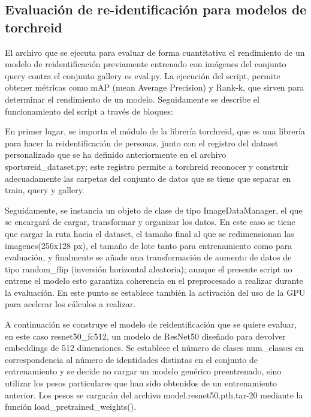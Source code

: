 \documentclass[12pt, a4paper, twoside]{article}
\begin{document}
 	\subsection{Evaluación de re-identificación para modelos de torchreid}
 	
 	El archivo que se ejecuta para evaluar de forma cuantitativa el rendimiento de un modelo de reidentificación previamente entrenado con imágenes del conjunto query contra el conjunto gallery es eval.py. La ejecución del script, permite obtener métricas como mAP (mean Average Precision) y Rank-k, que sirven para determinar el rendimiento de un modelo. Seguidamente se describe el funcionamiento del script a través de bloques:
 	
 	En primer lugar, se importa el módulo de la librería torchreid, que es una librería para hacer la reidentificación de personas, junto con el registro del dataset personalizado que se ha definido anteriormente en el archivo sportsreid\_dataset.py; este registro permite a torchreid reconocer y construir adecuadamente las carpetas del conjunto de datos que se tiene que separar en train, query y gallery.
 	
 	Seguidamente, se instancia un objeto de clase de tipo ImageDataManager, el que se encargará de cargar, transformar y organizar los datos. En este caso se tiene que cargar la ruta hacia el dataset, el tamaño final al que se redimensionan las imagenes(256x128 px), el tamaño de lote tanto para entrenamiento como para evaluación, y finalmente se añade una transformación de aumento de datos de tipo random\_flip (inversión horizontal aleatoria); aunque el presente script no entrene el modelo esto garantiza coherencia en el preprocesado a realizar durante la evaluación. En este punto se establece también la activación del uso de la GPU para acelerar los cálculos a realizar.
 	
 	A continuación se construye el modelo de reidentificación que se quiere evaluar, en este caso resnet50\_fc512, un modelo de ResNet50 diseñado para devolver embeddings de 512 dimensiones. Se establece el número de clases num\_classes en correspondencia al número de identidades distintas en el conjunto de entrenamiento y se decide no cargar un modelo genérico preentrenado, sino utilizar los pesos particulares que han sido obtenidos de un entrenamiento anterior. Los pesos se cargarán del archivo model.resnet50.pth.tar-20 mediante la función load\_pretrained\_weights().
 	
\end{document}
